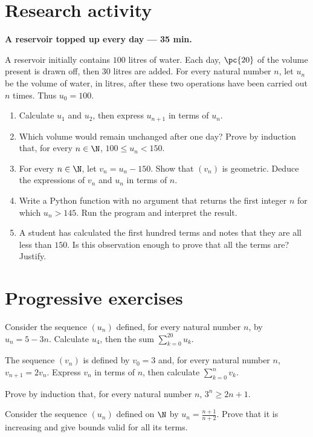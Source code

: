 \section{Research activity}\textbf{A reservoir topped up every day --- 35 min.}\par A reservoir initially contains $100$ litres of water. Each day, $\pc{20}$ of the volume present is drawn off, then $30$ litres are added. For every natural number $n$, let $u_n$ be the volume of water, in litres, after these two operations have been carried out $n$ times. Thus $u_0=100$.
\begin{enumerate}\item Calculate $u_1$ and $u_2$, then express $u_{n+1}$ in terms of $u_n$.
\item Which volume would remain unchanged after one day? Prove by induction that, for every $n\in\N$, $100\le u_n<150$.
\item For every $n\in\N$, let $v_n=u_n-150$. Show that $(v_n)$ is geometric. Deduce the expressions of $v_n$ and $u_n$ in terms of $n$.
\item Write a Python function with no argument that returns the first integer $n$ for which $u_n>145$. Run the program and interpret the result.
\item A student has calculated the first hundred terms and notes that they are all less than $150$. Is this observation enough to prove that all the terms are? Justify.\end{enumerate}

\mxnewpage
\section{Progressive exercises}

Consider the sequence $(u_n)$ defined, for every natural number $n$, by $u_n=5-3n$. Calculate $u_4$, then the sum $\displaystyle\sum_{k=0}^{20}u_k$.

The sequence $(v_n)$ is defined by $v_0=3$ and, for every natural number $n$, $v_{n+1}=2v_n$. Express $v_n$ in terms of $n$, then calculate $\displaystyle\sum_{k=0}^n v_k$.

Prove by induction that, for every natural number $n$, $3^n\ge2n+1$.

Consider the sequence $(u_n)$ defined on $\N$ by $u_n=\frac{n+1}{n+2}$. Prove that it is increasing and give bounds valid for all its terms.

